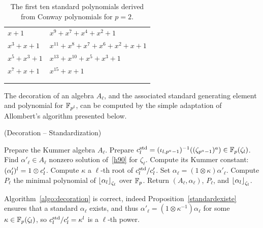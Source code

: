 \documentclass[sigconf]{acmart}
\begin{document}
\begin{table}[h]
  \centering
  \small
  \begin{tabularx}{\columnwidth}{>{\raggedleft\arraybackslash}X | >{\raggedleft\arraybackslash}X}
    $x+1$ & $x^9+x^7+x^4+x^2+1$\\
    $x^3+x+1$ & $x^{11}+x^8+x^7+x^6+x^2+x+1$\\
    $x^5+x^3+1$ & $x^{13}+x^{10}+x^5+x^3+1$\\
    $x^7+x+1$ & $x^{15}+x+1$ \\[0.3em]
    \multicolumn{2}{r}{$x^{17}+x^{11}+x^{10}+x^8+ x^7+x^6+x^4+x^3+x^2+x+1$} \\
    \multicolumn{2}{r}{$x^{19}+x^{17}+x^{16}+x^{15}+x^{14}+x^{13}+x^{12}+x^8+x^7+x^6+x^5+x^3+1$}
  \end{tabularx}
  
  \caption{The first ten standard polynomials derived from Conway
    polynomials for $p=2$.}
  \label{tab:std-polys}
\end{table}


The decoration of an algebra $A_\ell$, and the associated standard
generating element and polynomial for $\mathbb{F}_{p^l}$, can be computed by the simple adaptation of
Allombert's algorithm presented below. %

\begin{algorithm}
  \caption{(Decoration -- Standardization)}
  \label{algo:decoration}
  \begin{algorithmic}[1]
  \STATE Prepare the Kummer algebra $A_\ell$.
  \STATE Prepare $c^{\mathrm{std}}_l=({\iota_{{l},{p^a-1}}})^{-1}((\zeta_{p^a-1})^a)\in\mathbb{F}_p(\zeta_l)$.
  \STATE Find $\alpha'_\ell\in A_\ell$ nonzero solution of~\eqref{h90} for $\zeta_\ell$.
  \STATE Compute its Kummer constant: $(\alpha'_l)^l=1\otimes c'_l$.
  \STATE Compute $\kappa$ a $\ell$-th root of $c^{\mathrm{std}}_l/c'_l$.
  \STATE Set $\alpha_{\ell}=(1\otimes\kappa)\alpha'_\ell$.
  \STATE Compute $P_\ell$ the minimal polynomial of $\left\lfloor \alpha_{l} \right\rfloor_{\zeta_l}$ over $\mathbb{F}_{p}$.
  \STATE Return $(A_\ell,\alpha_\ell)$, $P_\ell$, and $\left\lfloor \alpha_l \right\rfloor_{\zeta_l}$.
  \end{algorithmic}
\end{algorithm}

Algorithm~\ref{algo:decoration} is correct, indeed Proposition~\ref{standardexiste} ensures that
a standard $\alpha_{\ell}$ exists, and thus $\alpha'_\ell=(1\otimes\kappa^{-1})\alpha_{\ell}$
for some $\kappa\in\mathbb{F}_{p}(\zeta_l)$, so $c^{\mathrm{std}}_l/c'_l=\kappa^l$ is a $\ell$-th power.
\end{document}
